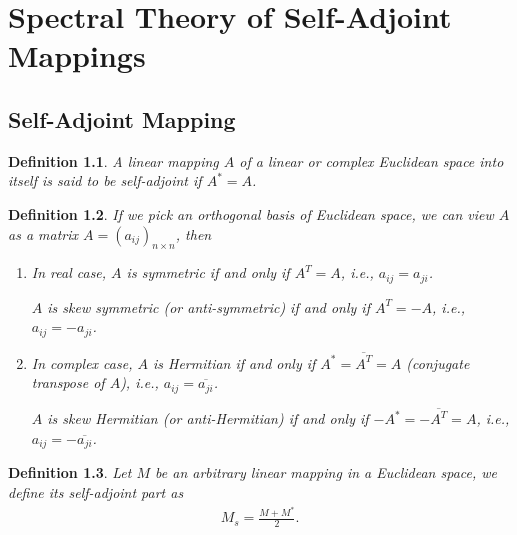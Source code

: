 \documentclass[10pt]{book}
\newtheorem{definition}{Definition}[chapter]
\theoremstyle{definition}
\numberwithin{equation}{chapter}
\begin{document}
\chapter{Spectral Theory of Self-Adjoint Mappings}
\section{Self-Adjoint Mapping}
\begin{definition}
A linear mapping $A$ of a linear or complex Euclidean space into itself is said to be self-adjoint if $A^* = A$.
\end{definition}

\begin{definition}
If we pick an orthogonal basis of Euclidean space, we can view $A$ as a matrix $A = (a_{ij})_{n\times n}$, then 
\begin{enumerate}[label=(\arabic*)]
    \item In real case, $A$ is symmetric if and only if $A^T = A$, i.e., $a_{ij} = a_{ji}$.
    
    $A$ is skew symmetric (or anti-symmetric) if and only if $A^T = -A$, i.e., $a_{ij} = -a_{ji}$.
    
    \item In complex case, $A$ is Hermitian if and only if $A^* = \overline{A^T} = A$ (conjugate transpose of $A$), i.e., $a_{ij} = \overline{a_{ji}}$.
    
    $A$ is skew Hermitian (or anti-Hermitian) if and only if $- A^* = - \overline{A^T} = A$, i.e., $a_{ij} = - \overline{a_{ji}}$.
\end{enumerate}
\end{definition}

\medskip

\begin{definition}
Let $M$ be an arbitrary linear mapping in a Euclidean space, we define its self-adjoint part as 
\begin{align*}
    M_s = \frac{M + M^*}{2}.
\end{align*}
\end{definition}

\medskip
\end{document}
